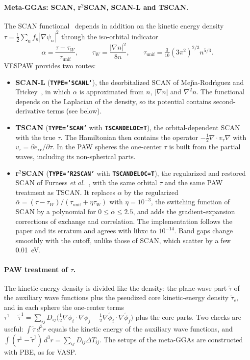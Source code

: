 \documentclass[11pt,a4paper,oneside]{book}
\newcommand{\key}[1]{\textbf{\texttt{#1}}}
\begin{document}
\paragraph{Meta-GGAs: SCAN, r$^2$SCAN, SCAN-L and TSCAN.} The SCAN
functional~\cite{sun15_prl115_036402} depends in addition on the kinetic
energy density $\tau=\frac12\sum_n f_n|\nabla\psi_n|^2$ through the
iso-orbital indicator
\begin{equation}
  \alpha = \frac{\tau-\tau_W}{\tau_{\mathrm{unif}}},\qquad
  \tau_W=\frac{|\nabla n|^2}{8n},\qquad
  \tau_{\mathrm{unif}}=\tfrac{3}{10}(3\pi^2)^{2/3}n^{5/3}.
\end{equation}
VESPAW provides two routes:
\begin{itemize}
\item \textbf{SCAN-L} (\key{TYPE='SCANL'}), the deorbitalized SCAN of
  Mej\'{\i}a-Rodr\'{\i}guez and Trickey~\cite{mejiarodriguez17_pra96_052512,mejiarodriguez18_prb98_115161},
  in which $\alpha$ is approximated from $n$, $|\nabla n|$ and $\nabla^2 n$.
  The functional depends on the Laplacian of the density, so its potential
  contains second-derivative terms (see below).
\item \textbf{TSCAN} (\key{TYPE='SCAN'} with \key{TSCANDELOC=T}), the
  orbital-dependent SCAN with the true $\tau$. The Hamiltonian then
  contains the operator $-\frac12\nabla\cdot v_\tau\nabla$ with
  $v_\tau=\partial e_{\mathrm{xc}}/\partial\tau$. In the PAW spheres the
  one-center $\tau$ is built from the partial waves, including its
  non-spherical parts.
\item \textbf{r$^2$SCAN} (\key{TYPE='R2SCAN'} with \key{TSCANDELOC=T}),
  the regularized and restored SCAN of Furness \emph{et
  al.}~\cite{furness20_jpcl11_8208}, with the same orbital $\tau$ and the
  same PAW treatment as TSCAN. It replaces $\alpha$ by the regularized
  $\bar\alpha=(\tau-\tau_W)/(\tau_{\mathrm{unif}}+\eta\tau_W)$ with
  $\eta=10^{-3}$, the switching function of SCAN by a polynomial for
  $0\le\bar\alpha\le2.5$, and adds the gradient-expansion corrections of
  exchange and correlation. The implementation follows the paper and its
  erratum and agrees with libxc to $10^{-14}$. Band gaps change smoothly
  with the cutoff, unlike those of SCAN, which scatter by a few 0.01~eV.
\end{itemize}

\paragraph{PAW treatment of $\tau$.} The kinetic-energy density is
divided like the density: the plane-wave part $\tilde\tau$ of the
auxiliary wave functions plus the pseudized core kinetic-energy density
$\tilde\tau_c$, and in each sphere the one-center terms
$\tau^1-\tilde\tau^1=\sum_{ij}D_{ij}\bigl(\tfrac12\nabla\phi_i\cdot\nabla\phi_j
-\tfrac12\nabla\tilde\phi_i\cdot\nabla\tilde\phi_j\bigr)$ plus the core
parts. Two checks are useful: $\int\tilde\tau\,d^3r$ equals the kinetic
energy of the auxiliary wave functions, and
$\int(\tau^1-\tilde\tau^1)\,d^3r=\sum_{ij}D_{ij}\Delta T_{ij}$. The setups
of the meta-GGAs are constructed with PBE, as for VASP.
\end{document}
